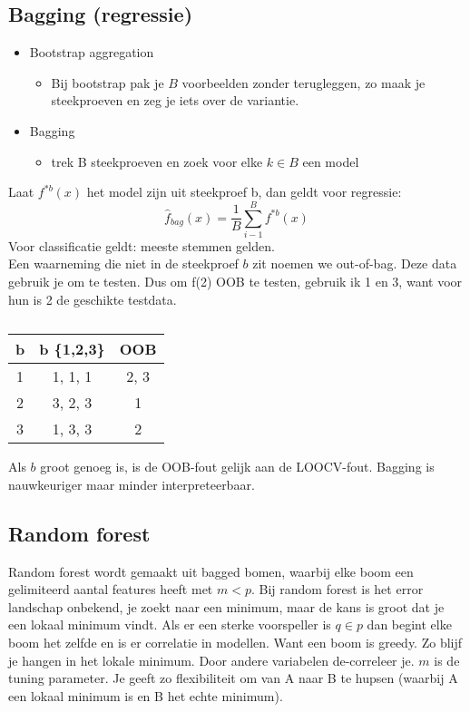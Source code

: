 {\subsection{Bagging (regressie)}
\begin{itemize}
    \item Bootstrap aggregation
    \begin{itemize}
        \item Bij bootstrap pak je $B$ voorbeelden zonder terugleggen, zo maak je steekproeven en zeg je iets over de variantie.
    \end{itemize}
    \item Bagging
    \begin{itemize}
        \item trek B steekproeven en zoek voor elke $k \in B$ een model
    \end{itemize}
\end{itemize}
Laat $f^{*b}(x)$ het model zijn uit steekproef b, dan geldt voor regressie:
\[\hat{f}_{bag}(x)=\frac{1}{B}\sum\limits_{i-1}^Bf^{*b}(x)\]
Voor classificatie geldt: meeste stemmen gelden.\\

\noindent Een waarneming die niet in de steekproef $b$ zit noemen we out-of-bag. Deze data gebruik je om te testen. Dus om f(2) OOB te testen, gebruik ik 1 en 3, want voor hun is 2 de geschikte testdata.\\
\begin{table}[h]
    \centering
    \begin{tabular}{c|c|c}
         b & b \{1,2,3\} & OOB \\ \hline
         1 & 1, 1, 1 & 2, 3\\
         2 & 3, 2, 3 & 1\\
         3 & 1, 3, 3 & 2 \\
    \end{tabular}
    \caption*{}
    \label{tab:my_label}
\end{table}
\noindent
Als $b$ groot genoeg is, is de OOB-fout gelijk aan de LOOCV-fout. Bagging is nauwkeuriger maar minder interpreteerbaar.\\

\subsection{Random forest}
\noindent Random forest wordt gemaakt uit bagged bomen, waarbij elke boom een gelimiteerd aantal features heeft met $m<p$. Bij random forest is het error landschap onbekend, je zoekt naar een minimum, maar de kans is groot dat je een lokaal minimum vindt. Als er een sterke voorspeller is $q\in p$ dan begint elke boom het zelfde en is er correlatie in modellen. Want een boom is greedy. Zo blijf je hangen in het lokale minimum. Door andere variabelen de-correleer je. $m$ is de tuning parameter. Je geeft zo flexibiliteit om van A naar B te hupsen (waarbij A een lokaal minimum is en B het echte minimum).\\

}
